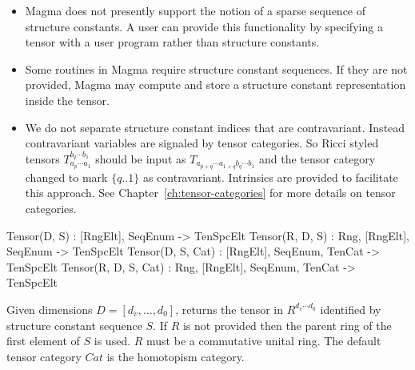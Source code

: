 \begin{itemize}
\item Magma does not presently support the notion of a sparse sequence of structure constants.
A user can provide this functionality by specifying a tensor with a user program rather
than structure constants. 

\item Some routines in Magma require structure constant sequences.  If they 
are not provided, Magma may compute and store a structure constant representation
inside the tensor.

\item We do not separate structure constant indices that are contravariant.  Instead contravariant variables are signaled by tensor categories.  So Ricci styled tensors $T_{a_p\cdots a_1}^{b_q\cdots b_1}$ should be input as $T_{a_{p+q}\cdots a_{1+q} b_q\cdots b_1}$ and the tensor
category changed to mark $\{q..1\}$ as contravariant. Intrinsics are provided to facilitate this approach.
See Chapter~\ref{ch:tensor-categories} for more details on tensor categories.
\end{itemize}
\medskip

\begin{intrinsics}
Tensor(D, S) : [RngElt], SeqEnum -> TenSpcElt
Tensor(R, D, S) : Rng, [RngElt], SeqEnum -> TenSpcElt
Tensor(D, S, Cat) : [RngElt], SeqEnum, TenCat -> TenSpcElt
Tensor(R, D, S, Cat) : Rng, [RngElt], SeqEnum, TenCat -> TenSpcElt
\end{intrinsics}

Given dimensions $D=[d_v,\dots,d_0]$, returns the tensor
in $R^{d_v\cdots d_0}$ identified by structure constant sequence $S$.
If $R$ is not provided then the parent ring of the first element of $S$ is used.  
$R$ must be a commutative unital ring.
The default tensor category $Cat$ is the homotopism category.


